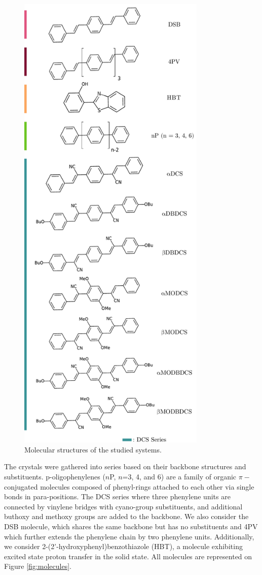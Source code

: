 \begin{figure}
\centering
\includegraphics[width=9cm]{Chapters/7Applications/molecules.pdf}
\caption{Molecular structures of the studied systems.}
\label{fig:molecules_app}
\end{figure}

The crystals were gathered into series based on their backbone structures and substituents. p-oligophenylenes ($n$P, $n$=3, 4, and 6) are a family of organic $\pi-$conjugated molecules composed of phenyl-rings attached to each other via single bonds in para-positions. The DCS series where three phenylene units are connected by vinylene bridges with cyano-group substituents, and additional buthoxy and methoxy groups are added to the backbone. We also consider the DSB molecule, which shares the same backbone but has no substituents and 4PV which further extends the phenylene chain by two phenylene units. Additionally, we consider 2-(2'-hydroxyphenyl)benzothiazole (HBT), a molecule exhibiting excited state proton transfer in the solid state. All molecules are represented on Figure \ref{fig:molecules}.

